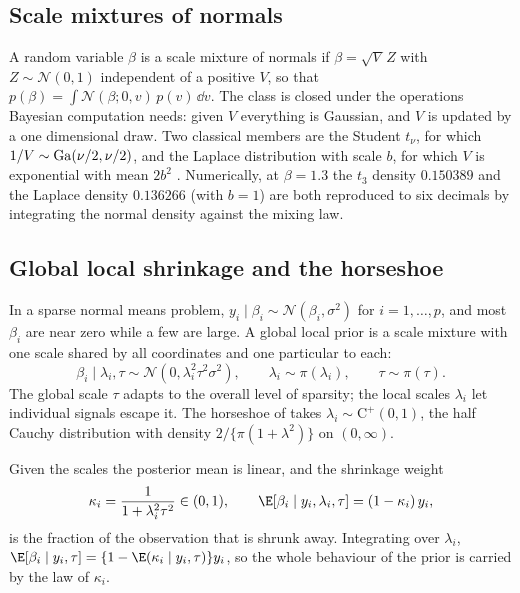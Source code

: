 \subsection{Scale mixtures of normals}\label{toolkit:sec:scalemix}

A random variable $\beta$ is a scale mixture of normals if $\beta=\sqrt V\,Z$ with $Z\sim
\mathcal{N}(0,1)$ independent of a positive $V$, so that
$p(\beta)=\int\mathcal{N}(\beta;0,v)\,p(v)\,\dd v$. The class is closed under the operations Bayesian
computation needs: given $V$ everything is Gaussian, and $V$ is updated by a one dimensional
draw. Two classical members are the Student $t_\nu$, for which $1/V\sim\mathrm{Ga}(\nu/2,\nu/2)$, and the
Laplace distribution with scale $b$, for which $V$ is exponential with mean $2b^2$
\citep{toolkit:andrews1974}. Numerically, at $\beta=1.3$ the $t_3$ density $0.150389$ and the
Laplace density $0.136266$ (with $b=1$) are both reproduced to six decimals by integrating the
normal density against the mixing law.

\subsection{Global local shrinkage and the horseshoe}\label{toolkit:sec:horseshoe}

In a sparse normal means problem, $y_i\mid\beta_i\sim\mathcal{N}(\beta_i,\sigma^2)$ for
$i=1,\dots,p$, and most $\beta_i$ are near zero while a few are large. A global local prior is a
scale mixture with one scale shared by all coordinates and one particular to each:
\begin{equation}\label{toolkit:eq:gl}
\beta_i\mid\lambda_i,\tau\sim\mathcal{N}(0,\lambda_i^2\tau^2\sigma^2),\qquad
\lambda_i\sim\pi(\lambda_i),\qquad \tau\sim\pi(\tau).
\end{equation}
The global scale $\tau$ adapts to the overall level of sparsity; the local scales $\lambda_i$ let
individual signals escape it. The horseshoe of \citet{toolkit:carvalho2010} takes
$\lambda_i\sim\mathrm{C}^+(0,1)$, the half Cauchy distribution with density
$2/\{\pi(1+\lambda^2)\}$ on $(0,\infty)$.

Given the scales the posterior mean is linear, and the shrinkage weight
\begin{equation}\label{toolkit:eq:kappa}
\kappa_i=\frac{1}{1+\lambda_i^2\tau^2}\in(0,1),\qquad
\E[\beta_i\mid y_i,\lambda_i,\tau]=(1-\kappa_i)\,y_i,
\end{equation}
is the fraction of the observation that is shrunk away. Integrating over $\lambda_i$,
$\E[\beta_i\mid y_i,\tau]=\{1-\E(\kappa_i\mid y_i,\tau)\}y_i$, so the whole behaviour of the prior is
carried by the law of $\kappa_i$.

